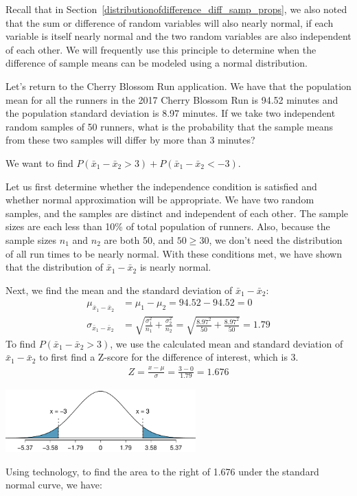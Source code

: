 Recall that in Section~\ref{distributionofdifference_diff_samp_props},
we also noted that the sum or difference of random variables will also
nearly normal, if each variable is itself nearly normal and the two
random variables are also independent of each other.
We will frequently use this principle to determine when the difference
of sample means can be modeled using a normal distribution.

\begin{examplewrap}
\begin{nexample}{
  Let's return to the Cherry Blossom Run application.
  We have that the population mean for all the runners in the 2017 Cherry Blossom Run is 94.52 minutes and the population standard deviation is 8.97 minutes.  If we take two independent random samples of 50 runners, what is the probability that the sample means from these two samples will differ by more than 3 minutes?}

We want to find
$P(\bar{x}_1 - \bar{x}_2> 3) + P(\bar{x}_1 - \bar{x}_2< -3)$.

Let us first determine whether the independence condition is satisfied and whether normal approximation will be appropriate.  We have two random samples, and the samples are distinct and independent of each other.  The sample sizes are each less than 10\% of total population of runners.  Also, because the sample sizes $n_1$ and $n_2$ are both 50, and $50 \ge 30$, we don't need the distribution of all run times to be nearly normal.  With these conditions met, we have shown that the distribution of $\bar{x}_1-\bar{x}_2$ is nearly normal.

Next, we find the mean and the standard deviation of $\bar{x}_1-\bar{x}_2$:
\begin{align*}
\mu_{\bar{x}_1-\bar{x}_2} &= \mu_1-\mu_2 = 94.52-94.52 = 0 \\
\sigma_{\bar{x}_1-\bar{x}_2}
  &= \sqrt{\frac{\sigma_1^2}{n_1} + \frac{\sigma_2^2}{n_2}}
  = \sqrt{\frac{8.97^2}{50} + \frac{8.97^2}{50}}= 1.79
\end{align*}
To find $P(\bar{x}_1-\bar{x}_2>3)$, we use the calculated mean and standard deviation of $\bar{x}_1-\bar{x}_2$ to first find a Z-score for the difference of interest, which is 3.
\begin{align*}
Z = \frac{x - \mu}{\sigma} = \frac{3 - 0}{1.79}=1.676
\end{align*}
\begin{center}
\includegraphics[width=0.55\textwidth]{ch_distributions/figures/cherry_blossom_2_mean_diff/cherry_blossom_2_mean_diff}
\end{center}
Using technology, to find the area to the right of 1.676 under the standard normal curve, we have:


\end{nexample}
\end{examplewrap}
